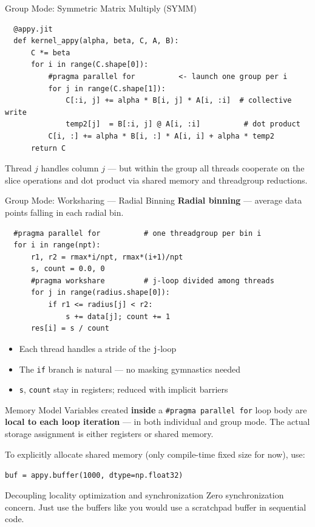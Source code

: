 \documentclass[aspectratio=169]{beamer}
\begin{document}
\begin{frame}[fragile]{Group Mode: Symmetric Matrix Multiply (SYMM)}
  \begin{verbatim}
  @appy.jit
  def kernel_appy(alpha, beta, C, A, B):
      C *= beta
      for i in range(C.shape[0]):
          #pragma parallel for          <- launch one group per i
          for j in range(C.shape[1]):
              C[:i, j] += alpha * B[i, j] * A[i, :i]  # collective write
              temp2[j]  = B[:i, j] @ A[i, :i]          # dot product
          C[i, :] += alpha * B[i, :] * A[i, i] + alpha * temp2
      return C
  \end{verbatim}

  \vspace{0.5em}
  Thread $j$ handles column $j$ — but within the group all threads cooperate on
  the slice operations and dot product via shared memory and threadgroup reductions.
\end{frame}

\begin{frame}[fragile]{Group Mode: Worksharing — Radial Binning}
  \textbf{Radial binning} — average data points falling in each radial bin.
  \begin{verbatim}
  #pragma parallel for          # one threadgroup per bin i
  for i in range(npt):
      r1, r2 = rmax*i/npt, rmax*(i+1)/npt
      s, count = 0.0, 0
      #pragma workshare         # j-loop divided among threads
      for j in range(radius.shape[0]):
          if r1 <= radius[j] < r2:
              s += data[j]; count += 1
      res[i] = s / count
  \end{verbatim}

  \begin{itemize}
    \item Each thread handles a stride of the \texttt{j}-loop
    \item The \texttt{if} branch is natural — no masking gymnastics needed
    \item \texttt{s}, \texttt{count} stay in registers; reduced with implicit barriers
  \end{itemize}
\end{frame}

\begin{frame}{Memory Model}
  Variables created \textbf{inside} a \texttt{\#pragma parallel for} loop body are
  \textbf{local to each loop iteration} — in both individual and group mode. The actual
  storage assignment is either registers or shared memory. 

  \vspace{0.8em}
  To explicitly allocate shared memory (only compile-time fixed size for now), use:
  
    \texttt{buf = appy.buffer(1000, dtype=np.float32)}
  

  \vspace{0.8em}
  \begin{alertblock}{Decoupling locality optimization and synchronization}
    Zero synchronization concern. Just use the buffers like you would use a 
    scratchpad buffer in sequential code.
  \end{alertblock}

\end{frame}
\end{document}
